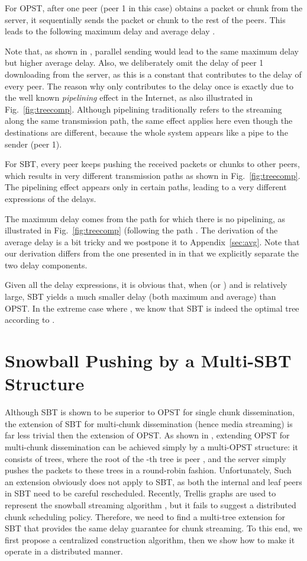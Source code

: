 \documentclass[conference]{IEEEtran}
\begin{document}
  For OPST, after one peer (peer 1 in this case) obtains a packet or chunk from the server, it sequentially sends the packet or chunk to the rest of the peers. This leads to the following maximum delay  and average delay .

Note that, as shown in \cite{Liu-MM07}, parallel sending would lead to the same maximum delay but higher average delay. Also, we deliberately omit the delay of peer 1 downloading from the server, as this is a constant that contributes to the delay of every peer. The reason why  only contributes to the delay once is exactly due to the well known \textit{pipelining} effect in the Internet, as also illustrated in Fig.~\ref{fig:treecomp}. Although pipelining traditionally refers to the streaming along the same transmission path, the same effect applies here even though the destinations are different, because the whole system appears like a pipe to the sender (peer 1).

  For SBT, every peer keeps pushing the received packets or chunks to other peers, which results in very different transmission paths as shown in Fig.~\ref{fig:treecomp}. The pipelining effect appears only in certain paths, leading to a very different expressions of the delays.

The maximum delay comes from the path for which there is no pipelining, as illustrated in Fig.~\ref{fig:treecomp} (following the path . The derivation of the average delay is a bit tricky and we postpone it to Appendix~\ref{sec:avg}. Note that our derivation differs from the one presented in \cite{Liu-MM07} in that we explicitly separate the two delay components.

  Given all the delay expressions, it is obvious that, when  (or ) and  is relatively large, SBT yields a much smaller delay (both maximum and average) than OPST. In the extreme case where , we know that SBT is indeed the optimal tree according to \cite{Liu-MM07}.

\section{Snowball Pushing by a Multi-SBT Structure} \label{sec:snap}
Although SBT is shown to be superior to OPST for single chunk dissemination, the extension of SBT for multi-chunk dissemination (hence media streaming) is far less trivial then the extension of OPST. As shown in \cite{LiuSJRC-SIGMETRICS08}, extending OPST for multi-chunk dissemination can be achieved simply by a multi-OPST structure: it consists of  trees, where the root of the -th tree is peer , and the server simply pushes the packets to these trees in a round-robin fashion. Unfortunately, Such an extension obviously does not apply to SBT, as both the internal and leaf peers in SBT need to be careful rescheduled. Recently, Trellis graphs are used to represent the snowball streaming algorithm \cite{FengLL-INFOCOM09}, but it fails to suggest a distributed chunk scheduling policy. Therefore, we need to find a multi-tree extension for SBT that provides the same delay guarantee for chunk streaming. To this end, we first propose a centralized construction algorithm, then we show how to make it operate in a distributed manner.
\end{document}
